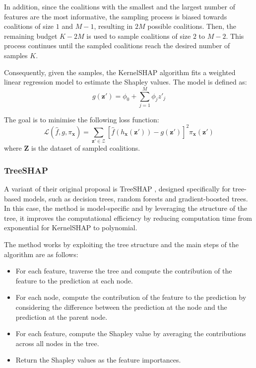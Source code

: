 In addition, since the coalitions with the smallest and the largest number of features are the most informative, the sampling process is biased towards coalitions of size $1$ and $M-1$, resulting in $2M$ possible coalitions. Then, the remaining budget $K - 2M$ is used to sample coalitions of size $2$ to $M-2$. This process continues until the sampled coalitions reach the desired number of samples $K$.

Consequently, given the samples, the KernelSHAP algorithm fits a weighted linear regression model to estimate the Shapley values. The model is defined as:
\begin{equation}
    g(\mathbf{z}') = \phi_0 + \sum_{j=1}^{M} \phi_j z'_j
\end{equation}

The goal is to minimise the following loss function:
\begin{equation}
    \mathcal{L}(\hat{f}, g, \pi_{\mathbf{x}}) = \sum_{\mathbf{z}' \in \mathcal{Z}} \left[\hat{f} \left(h_{\mathbf{x}}\left(\mathbf{z}'\right)\right) - g(\mathbf{z}')\right]^2 \pi_{\mathbf{x}}(\mathbf{z}')
\end{equation}
where $\mathbf{Z}$ is the dataset of sampled coalitions. 

\subsubsection{TreeSHAP} \label{sec:treeshap}

A variant of their original proposal is TreeSHAP \cite{Lundberg2019}, designed specifically for tree-based models, such as decision trees, random forests and gradient-boosted trees. In this case, the method is model-specific and by leveraging the structure of the tree, it improves the computational efficiency by reducing computation time from exponential for KernelSHAP to polynomial. 

The method works by exploiting the tree structure and the main steps of the algorithm are as follows:
\begin{itemize}
    \item For each feature, traverse the tree and compute the contribution of the feature to the prediction at each node.
    \item For each node, compute the contribution of the feature to the prediction by considering the difference between the prediction at the node and the prediction at the parent node.
    \item For each feature, compute the Shapley value by averaging the contributions across all nodes in the tree.
    \item Return the Shapley values as the feature importances.
\end{itemize} 

